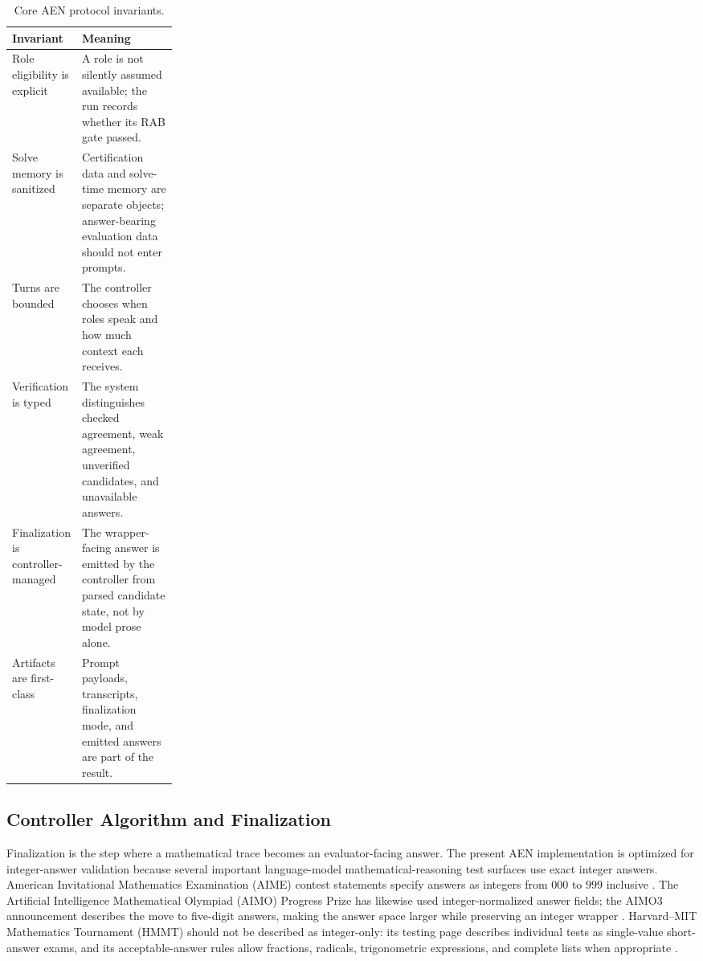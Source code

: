 \documentclass[11pt]{article}
\newcommand{\rab}{RAB}
\begin{document}
\begin{table}[t]
\centering
\small
\begin{tabularx}{\linewidth}{p{0.24\linewidth}X}
\toprule
Invariant & Meaning \\
\midrule
Role eligibility is explicit & A role is not silently assumed available; the run records whether its \rab{} gate passed. \\
Solve memory is sanitized & Certification data and solve-time memory are separate objects; answer-bearing evaluation data should not enter prompts. \\
Turns are bounded & The controller chooses when roles speak and how much context each receives. \\
Verification is typed & The system distinguishes checked agreement, weak agreement, unverified candidates, and unavailable answers. \\
Finalization is controller-managed & The wrapper-facing answer is emitted by the controller from parsed candidate state, not by model prose alone. \\
Artifacts are first-class & Prompt payloads, transcripts, finalization mode, and emitted answers are part of the result. \\
\bottomrule
\end{tabularx}
\caption{Core AEN protocol invariants.}
\label{tab:invariants}
\end{table}

\subsection{Controller Algorithm and Finalization}

Finalization is the step where a mathematical trace becomes an evaluator-facing answer. The present AEN implementation is optimized for integer-answer validation because several important language-model mathematical-reasoning test surfaces use exact integer answers. American Invitational Mathematics Examination (AIME) contest statements specify answers as integers from \(000\) to \(999\) inclusive \citep{aops2000aime}. The Artificial Intelligence Mathematical Olympiad (AIMO) Progress Prize has likewise used integer-normalized answer fields; the AIMO3 announcement describes the move to five-digit answers, making the answer space larger while preserving an integer wrapper \citep{aimoprize2025third}. Harvard--MIT Mathematics Tournament (HMMT) should not be described as integer-only: its testing page describes individual tests as single-value short-answer exams, and its acceptable-answer rules allow fractions, radicals, trigonometric expressions, and complete lists when appropriate \citep{hmmtTesting,hmmtAcceptableAnswers}.
\end{document}
